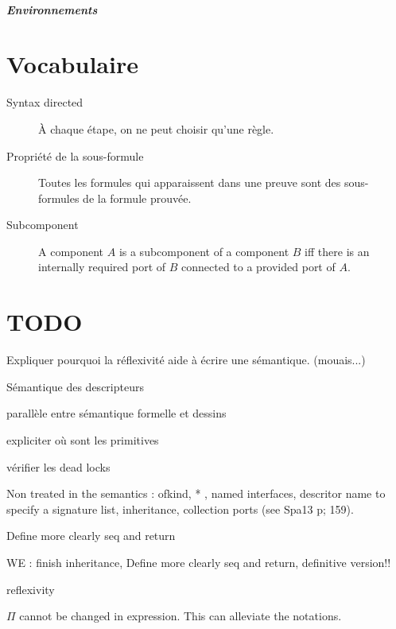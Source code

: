 \begin{appendices}
\paragraph{Environnements}

\chapter{Vocabulaire}
\begin{description}
\item[Syntax directed] À chaque étape, on ne peut choisir qu'une règle.
\item[Propriété de la sous-formule] Toutes les formules qui apparaissent dans une preuve sont des sous-formules de la formule prouvée.
\item[Subcomponent] A component $A$ is a subcomponent of a component $B$ iff there is an internally required port of $B$ connected to a provided port of $A$.
\end{description}


\chapter{TODO}
Expliquer pourquoi la réflexivité aide à écrire une sémantique. (mouais...)

Sémantique des descripteurs 

parallèle entre sémantique formelle et dessins

expliciter où sont les primitives

vérifier les dead locks


Non treated in the semantics : ofkind, * , named interfaces, descritor name to specify a signature list, inheritance, collection ports (see Spa13 p; 159).

Define more clearly seq and return

WE : finish inheritance, Define more clearly seq and return, definitive version!!

reflexivity

$\Pi$ cannot be changed in expression. This can alleviate the notations.
\end{appendices}
\cite{SDT14}
\cite{Spa13}





